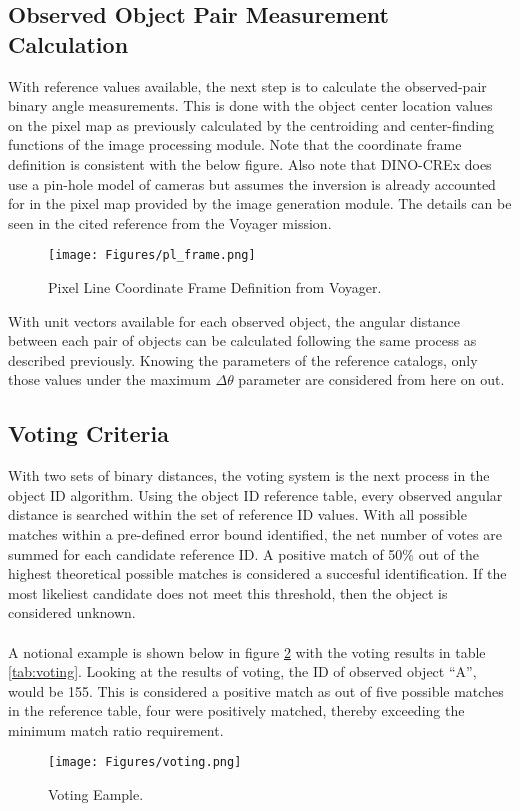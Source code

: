 \documentclass[]{DINOReportMemo}
\begin{document}
\subsection{Observed Object Pair Measurement Calculation}
With reference values available, the next step is to calculate the observed-pair binary angle measurements. This is done with the object center location values on the pixel map as previously calculated by the centroiding and center-finding functions of the image processing module. Note that the coordinate frame definition is consistent with the below figure. Also note that DINO-CREx does use a pin-hole model of cameras but assumes the inversion is already accounted for in the pixel map provided by the image generation module. The details can be seen in the cited reference from the Voyager mission\cite{voyageruranus}.   

\begin{figure}[H]
  \begin{center}
  \texttt{[image: Figures/pl\_frame.png]}
  \caption{Pixel Line Coordinate Frame Definition from Voyager\cite{voyageruranus}.}
  \label{fig:pl_frame}
  \end{center} 
\end{figure}

\noindent With unit vectors available for each observed object, the angular distance between each pair of objects can be calculated following the same process as described previously. Knowing the parameters of the reference catalogs, only those values under the maximum $\Delta\theta$ parameter are considered from here on out.\\

\subsection{Voting Criteria} With two sets of binary distances, the voting system is the next process in the object ID algorithm. Using the object ID reference table, every observed angular distance is searched within the set of reference ID values. With all possible matches within a pre-defined error bound identified, the net number of votes are summed for each candidate reference ID. A positive match of 50\% out of the highest theoretical possible matches is considered a succesful identification. If the most likeliest candidate does not meet this threshold, then the object is considered unknown. \\
\\
A notional example is shown below in figure \ref{fig:voting} with the voting results in table \ref{tab:voting}. Looking at the results of voting, the ID of observed object ``A'', would be 155. This is considered a positive match as out of five possible matches in the reference table, four were positively matched, thereby exceeding the minimum match ratio requirement. \\
 \begin{figure}[H]
  \begin{center}
  \texttt{[image: Figures/voting.png]}
  \caption{Voting Eample.}
  \label{fig:voting}
  \end{center} 
\end{figure}
\end{document}

